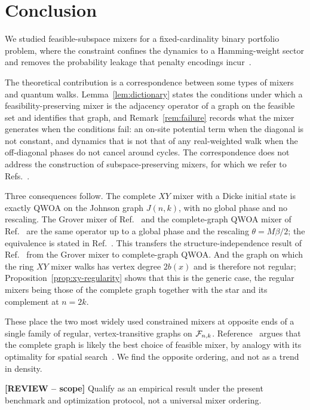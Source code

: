 \section{\label{sec:conclusion}Conclusion}

We studied feasible-subspace mixers for a fixed-cardinality binary portfolio problem, where the constraint confines the dynamics to a Hamming-weight sector and removes the probability leakage that penalty encodings incur~\cite{Hadfield2019,Slate2021}.

The theoretical contribution is a correspondence between some types of mixers and quantum walks. Lemma~\ref{lem:dictionary} states the conditions under which a feasibility-preserving mixer is the adjacency operator of a graph on the feasible set and identifies that graph, and Remark~\ref{rem:failure} records what the mixer generates when the conditions fail: an on-site potential term when the diagonal is not constant, and dynamics that is not that of any real-weighted walk when the off-diagonal phases do not cancel around cycles. The correspondence does not address the construction of subspace-preserving mixers, for which we refer to Refs.~\cite{Fuchs2022,Fuchs2024}.

Three consequences follow. The complete $XY$ mixer with a Dicke initial state is exactly QWOA on the Johnson graph $J(n,k)$, with no global phase and no rescaling. The Grover mixer of Ref.~\cite{Bartschi2020} and the complete-graph QWOA mixer of Ref.~\cite{Slate2021} are the same operator up to a global phase and the rescaling $\theta=M\beta/2$; the equivalence is stated in Ref.~\cite{Bridi2024}. This transfers the structure-independence result of Ref.~\cite{Bridi2024} from the Grover mixer to complete-graph QWOA. And the graph on which the ring $XY$ mixer walks has vertex degree $2b(x)$ and is therefore not regular; Proposition~\ref{prop:xy-regularity} shows that this is the generic case, the regular mixers being those of the complete graph together with the star and its complement at $n=2k$.

These place the two most widely used constrained mixers at opposite ends of a single family of regular, vertex-transitive graphs on $\mathcal{F}_{n,k}$. Reference~\cite{Slate2021} argues that the complete graph is likely the best choice of feasible mixer, by analogy with its optimality for spatial search~\cite{Zalka1999,Childs2004,Roland2003}. We find the opposite ordering, and not as a trend in density.

{\color{red}\textbf{[REVIEW -- scope]} Qualify as an empirical result under the present benchmark and optimization protocol, not a universal mixer ordering.}

